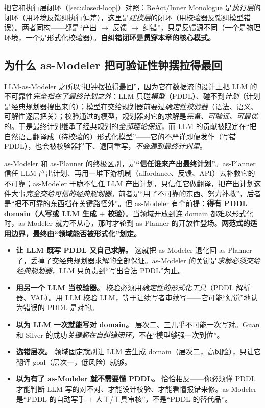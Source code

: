 \noindent 把它和执行层闭环（\cref{sec:closed-loop}）对照：ReAct/Inner Monologue 是\emph{执行层}的闭环（用环境反馈纠执行偏差），这里是\emph{建模层}的闭环（用校验器反馈纠模型错误）。两者同构——都是“产出 $\to$ 反馈 $\to$ 纠错”，只是反馈源不同（一个是物理环境，一个是形式化校验器）。\textbf{自纠错闭环是贯穿本章的核心模式。}

\subsection{为什么 as-Modeler 把可验证性钟摆拉得最回}
\label{sec:modeler-pendulum}

LLM-as-Modeler 之所以“把钟摆拉得最回”，因为它在数据流的设计上把 LLM 的不可靠性\emph{完全挡在了最终计划之外}：LLM 只碰\emph{模型}（PDDL）、碰不到\emph{计划}（计划是经典规划器搜出来的）；模型在交给规划器前要过\emph{确定性校验器}（语法、语义、可解性逐层把关）；校验通过的模型，规划器对它的求解是\emph{完备、可验证、可最优}的。于是最终计划继承了经典规划的\emph{全部理论保证}，而 LLM 的贡献被限定在“把自然语言翻译成（待校验的）形式化模型”——它的不严谨即便发作（写错 PDDL），也会被校验器拦下、退回重写，\emph{不会漏到最终计划里}。

\begin{insight}
as-Modeler 和 as-Planner 的终极区别，是\textbf{“信任谁来产出最终计划”}。as-Planner 信任 LLM 产出计划、再用一堆下游机制（affordance、反馈、API）去补救它的不可靠；as-Modeler 干脆不信任 LLM 产出计划，只信任它做翻译，把产出计划这件大事\emph{完全交给可信的经典规划器}。前者是“用了不可靠的东西、努力补救”，后者是“把不可靠的东西挡在关键路径外”。但 as-Modeler 有个前提：\textbf{得有 PDDL domain（人写或 LLM 生成 $+$ 校验）}。当领域开放到连 domain 都难以形式化时，as-Modeler 就力不从心，那时才轮到 as-Planner 的开放性登场。\textbf{两范式的适用边界，最终由“领域能否被形式化”划定。}
\end{insight}

\begin{pitfall}[本节常见陷阱]
\begin{itemize}
  \item \textbf{让 LLM 既写 PDDL 又自己求解。} 这就把 as-Modeler 退化回 as-Planner 了，丢掉了交经典规划器求解的全部保证。as-Modeler 的关键是\emph{求解必须交给经典规划器}，LLM 只负责到“写出合法 PDDL”为止。
  \item \textbf{用另一个 LLM 当校验器。} 校验必须用\emph{确定性的形式化工具}（PDDL 解析器、VAL）。用 LLM 校验 LLM，等于让续写者审续写——它可能“幻觉”地认为错误的 PDDL 是对的。
  \item \textbf{以为 LLM 一次就能写对 domain。} 层次二、三几乎不可能一次写对。Guan 和 Silver 的成功\emph{关键都在自纠错闭环}，不在“模型够强一次到位”。
  \item \textbf{选错层次。} 领域固定就别让 LLM 去生成 domain（层次二，高风险），只让它翻译 goal（层次一，低风险）就够。
  \item \textbf{以为有了 as-Modeler 就不需要懂 PDDL。} 恰恰相反——你必须懂 PDDL 才能判断 LLM 写的对不对、才能设计校验、才能看懂报错来修。as-Modeler 是“PDDL 的自动写手 $+$ 人工/工具审核”，不是“PDDL 的替代品”。
\end{itemize}
\end{pitfall}

